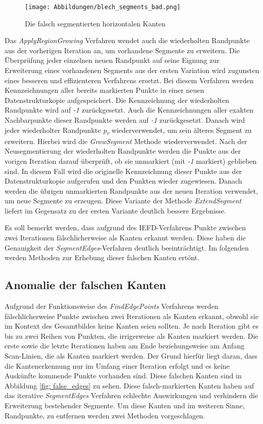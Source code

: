 \begin{figure}[h]
	\texttt{[image: Abbildungen/blech\_segments\_bad.png]}
	\centering
	\caption{Die falsch segmentierten horizontalen Kanten}
	\label{fig: bad_segments}
\end{figure}

Das \textit{ApplyRegionGrowing} Verfahren wendet auch die wiederholten Randpunkte aus der vorherigen Iteration an, um vorhandene Segmente zu erweitern. Die Überprüfung jeder einzelnen neuen Randpunkt auf seine Eignung zur Erweiterung eines vorhandenen Segments aus der ersten Variation wird zugunsten eines besseren und effizienteren Verfahrens ersetzt. Bei diesem Verfahren werden Kennzeichnungen aller bereits markierten Punkte in einer neuen Datenstrukturkopie aufgespeichert. Die Kennzeichnung der wiederholten Randpunkte wird auf \textit{-1} zurückgesetzt. Auch die Kennzeichnungen aller exakten Nachbarpunkte dieser Randpunkte werden auf \textit{-1} zurückgesetzt. Danach wird jeder wiederholter Randpunkte \textit{p\textsubscript{r}} wiederverwendet, um sein älteres Segment zu erweitern. Hierbei wird die \textit{GrowSegment} Methode wiederverwendet. Nach der Neusegmentierung der wiederholten Randpunkte werden die Punkte aus der vorigen Iteration darauf überprüft, ob sie unmarkiert (mit \textit{-1} markiert) geblieben sind. In diesem Fall wird die originelle Kennzeichnung dieser Punkte aus der Datenstrukturkopie aufgerufen und den Punkten wieder zugewiesen. Danach werden die übrigen unmarkierten Randpunkte aus der neuen Iteration verwendet, um neue Segmente zu erzeugen. Diese Variante der Methode \textit{ExtendSegment} liefert im Gegensatz zu der ersten Variante deutlich bessere Ergebnisse.

Es soll bemerkt werden, dass aufgrund des IEFD-Verfahrens Punkte zwischen zwei Iterationen fälschlicherweise als Kanten erkannt werden. Diese haben die Genauigkeit der \textit{SegmentEdges}-Verfahren deutlich beeinträchtigt. Im folgenden werden Methoden zur Erhebung dieser falschen Kanten ertönt.

\subsection{Anomalie der falschen Kanten} \label{false_edges}
Aufgrund der Funktionsweise des \textit{FindEdgePoints} Verfahrens werden fälschlicherweise Punkte zwischen zwei Iterationen als Kanten erkannt, obwohl sie im Kontext des Gesamtbildes keine Kanten seien sollten. Je nach Iteration gibt es bis zu zwei Reihen von Punkten, die irrigerweise als Kanten markiert werden. Die erste sowie die letzte Iterationen haben am Ende beziehungsweise am Anfang Scan-Linien, die als Kanten markiert werden. Der Grund hierfür liegt daran, dass die Kantenerkennung nur im Umfang einer Iteration erfolgt und es keine Auskünfte kommende Punkte vorhanden sind. Diese falschen Kanten sind in Abbildung \ref{fig: false_edges} zu sehen. Diese falsch-markierten Kanten haben auf das iterative \textit{SegmentEdges} Verfahren schlechte Auswirkungen und verhindern die Erweiterung bestehender Segmente. Um diese Kanten und im weiteren Sinne, Randpunkte, zu entfernen werden zwei Methoden vorgeschlagen.

